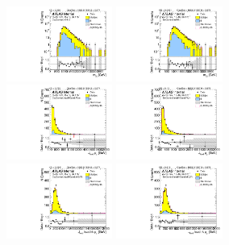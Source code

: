 \begin{figure}[htbp!]
\begin{center}
\includegraphics[angle=270, width=0.31\textwidth]{./figures/boosted/Prereweight/Moriond_ThreeTag_Control_mHH_l_1.pdf}
\includegraphics[angle=270, width=0.31\textwidth]{./figures/boosted/Control/b77_ThreeTag_Control_mHH_l_1.pdf}\\
\includegraphics[angle=270, width=0.31\textwidth]{./figures/boosted/Prereweight/Moriond_ThreeTag_Control_leadHCand_Pt_m.pdf}
\includegraphics[angle=270, width=0.31\textwidth]{./figures/boosted/Control/b77_ThreeTag_Control_leadHCand_Pt_m.pdf}\\
\includegraphics[angle=270, width=0.31\textwidth]{./figures/boosted/Prereweight/Moriond_ThreeTag_Control_leadHCand_trk0_Pt.pdf}
\includegraphics[angle=270, width=0.31\textwidth]{./figures/boosted/Control/b77_ThreeTag_Control_leadHCand_trk0_Pt.pdf}\\

\end{center}
\end{figure}
